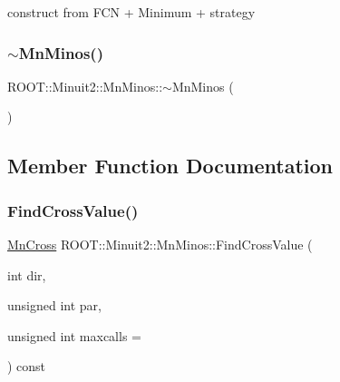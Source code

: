 construct from F\+CN + Minimum + strategy 

\mbox{\label{classROOT_1_1Minuit2_1_1MnMinos_a64625d0dd4308a7c8fb8930c980f11bd}} 
\subsubsection{\texorpdfstring{$\sim$MnMinos()}{~MnMinos()}\hspace{0.1cm}{\footnotesize\ttfamily [2/2]}}
{\footnotesize\ttfamily R\+O\+O\+T\+::\+Minuit2\+::\+Mn\+Minos\+::$\sim$\+Mn\+Minos (\begin{DoxyParamCaption}{ }\end{DoxyParamCaption})\hspace{0.3cm}{\ttfamily [inline]}}



\subsection{Member Function Documentation}
\mbox{\label{classROOT_1_1Minuit2_1_1MnMinos_a4b8df109769bd0bee2127da68615bb11}} 
\subsubsection{\texorpdfstring{FindCrossValue()}{FindCrossValue()}\hspace{0.1cm}{\footnotesize\ttfamily [1/2]}}
{\footnotesize\ttfamily \mbox{\hyperlink{classROOT_1_1Minuit2_1_1MnCross}{Mn\+Cross}} R\+O\+O\+T\+::\+Minuit2\+::\+Mn\+Minos\+::\+Find\+Cross\+Value (\begin{DoxyParamCaption}\item[{int}]{dir,  }\item[{unsigned int}]{par,  }\item[{unsigned int}]{maxcalls = {} }\end{DoxyParamCaption}) const\hspace{0.3cm}{\ttfamily [protected]}}




